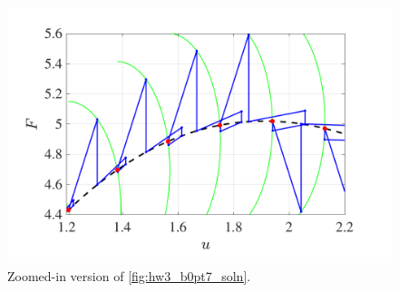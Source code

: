 \begin{figure}[!ht]
    \centering
    \includegraphics[width=0.7\linewidth]{homework/hw3/hw3_b0pt7_close.pdf}
    \caption{Zoomed-in version of \cref{fig:hw3_b0pt7_soln}.}
    \label{fig:hw3_b0pt7_close}
\end{figure}